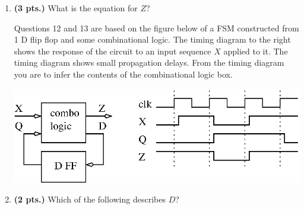 \documentclass{article}
\begin{document}
\begin{enumerate}
\item {\bf (3 pts.)} What is the equation for $Z$?


Questions 12 and 13 are based on the figure below of a
FSM constructed from 1 D flip flop
and some combinational logic.  The timing diagram to the
right shows the response of the circuit to an input sequence
$X$ applied to it.  The timing diagram shows small propagation
delays.  From the timing diagram you are to infer the contents
of the combinational logic box.

\includegraphics{./Fig3/fsm_analysis.eps}


\item {\bf (2 pts.)} Which of the following describes $D$?



\end{enumerate}
\end{document}
